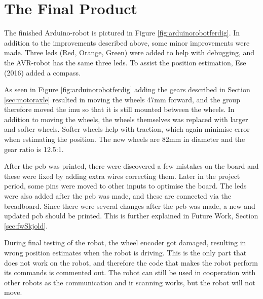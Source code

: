 \newpage
\section{The Final Product}
\label{sec:finardu}
The finished Arduino-robot is pictured in Figure \ref{fig:arduinorobotferdig}. In addition to the improvements described above, some minor improvements were made. Three \acrshort{led}s (Red, Orange, Green) were added to help with debugging, and the AVR-robot has the same three \acrshort{led}s. To assist the position estimation, Ese (2016) added a compass.

As seen in Figure \ref{fig:arduinorobotferdig} adding the gears described in Section \ref{sec:motoraxle} resulted in moving the wheels 47mm forward, and the group therefore moved the \acrshort{imu} so that it is still mounted between the wheels. In addition to moving the wheels, the wheels themselves was replaced with larger and softer wheels. Softer wheels help with traction, which again minimise error when estimating the position. The new wheels are 82mm in diameter and the gear ratio is 12.5:1.

After the \acrshort{pcb} was printed, there were discovered a few mistakes on the board and these were fixed by adding extra wires correcting them. Later in the project period, some pins were moved to other inputs to optimise the board. The \acrshort{led}s were also added after the \acrshort{pcb} was made, and these are connected via the breadboard. Since there were several changes after the \acrshort{pcb} was made, a new and updated \acrshort{pcb} should be printed. This is further explained in Future Work, Section \ref{sec:fwSkjold}.

During final testing of the robot, the wheel encoder got damaged, resulting in wrong position estimates when the robot is driving. This is the only part that does not work on the robot, and therefore the code that makes the robot perform its commands is commented out. The robot can still be used in cooperation with other robots as the communication and \acrshort{ir} scanning works, but the robot will not move.
\vspace*{20pt}
